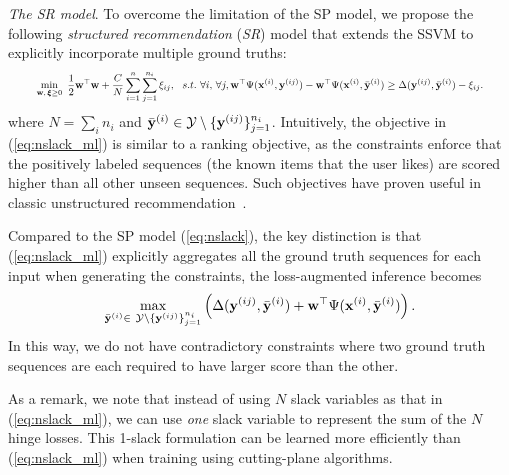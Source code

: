 \emph{The SR model}.
To overcome the limitation of the SP model,
we propose the following \emph{structured recommendation} (\emph{SR}) model that extends the SSVM to explicitly incorporate multiple ground truths: %
\begin{equation}
\label{eq:nslack_ml}
\resizebox{0.93\linewidth}{!}{$
\begin{aligned}
\min_{\w, \, \bm{\xi} \ge 0} ~ \frac{1}{2} \w^\top \w + \frac{C}{N} \sum_{i=1}^n \sum_{j=1}^{n_i} \xi_{ij}, ~~s.t.~ \forall i, \, \forall j, 
  \w^\top \Psi(\x^{(i)}, \y^{(ij)}) - \w^\top \Psi(\x^{(i)}, \bar{\y}^{(i)}) \ge
  \Delta(\y^{(ij)}, \bar{\y}^{(i)}) - \xi_{ij}.
\end{aligned}
$}
\end{equation}
where $N = \sum_i n_i$ and $\bar{\mathbf{y}}^{(i)} \in \mathcal{Y} \setminus \{\mathbf{y}^{(ij)}\}_{j=1}^{n_i}$.
Intuitively, the objective in (\ref{eq:nslack_ml}) is similar to a ranking objective, as the constraints enforce
that the positively labeled sequences (the known items that the user likes) are scored
higher than all other unseen sequences.
Such objectives have proven useful in classic unstructured recommendation~\cite{bpr09}.

Compared to the SP model (\ref{eq:nslack}), the key distinction is that (\ref{eq:nslack_ml})
explicitly aggregates all the ground truth sequences for each input when generating the constraints,
\ie the loss-augmented inference becomes
\begin{equation}
\label{eq:loss_aug_inf}
\max_{\bar{\mathbf{y}}^{(i)} \in \ \mathcal{Y} \setminus \{\mathbf{y}^{(ij)}\}_{j=1}^{n_i}}
     \left( \Delta(\mathbf{y}^{(ij)}, \bar{\mathbf{y}}^{(i)}) + \mathbf{w}^\top \Psi(\mathbf{x}^{(i)}, \bar{\mathbf{y}}^{(i)}) \right).
\end{equation}
In this way, we do not have contradictory constraints where
two ground truth sequences are each required to have larger score than the other.

As a remark, we note that instead of using $N$ slack variables as that in (\ref{eq:nslack_ml}),
we can use \emph{one} slack variable to represent the sum of the $N$ hinge losses. %
This 1-slack formulation can be learned more efficiently than (\ref{eq:nslack_ml})
when training using cutting-plane algorithms. %

